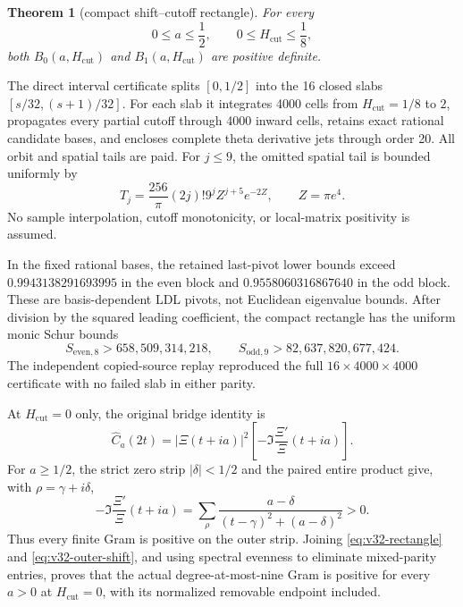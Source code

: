 \documentclass[11pt]{article}
\newtheorem{theorem}{Theorem}[section]
\theoremstyle{definition}
\theoremstyle{remark}
\begin{document}
\begin{theorem}[compact shift--cutoff rectangle]
For every
\begin{equation}
 0\le a\le\frac12,
 \qquad 0\le H_{\mathrm{cut}}\le\frac18,
 \label{eq:v32-rectangle}
\end{equation}
both $B_0(a,H_{\mathrm{cut}})$ and
$B_1(a,H_{\mathrm{cut}})$ are positive definite.
\end{theorem}

The direct interval certificate splits $[0,1/2]$ into the 16 closed slabs
$[s/32,(s+1)/32]$. For each slab it integrates 4000 cells from
$H_{\mathrm{cut}}=1/8$ to $2$, propagates every partial cutoff through 4000
inward cells, retains exact rational candidate bases, and encloses complete
theta derivative jets through order 20. All orbit and spatial tails are paid.
For $j\le9$, the omitted spatial tail is bounded uniformly by
\begin{equation}
 T_j=\frac{256}{\pi}(2j)!9^jZ^{j+5}e^{-2Z},
 \qquad Z=\pi e^4.
 \label{eq:v32-spatial-tail}
\end{equation}
No sample interpolation, cutoff monotonicity, or local-matrix positivity is
assumed.

In the fixed rational bases, the retained last-pivot lower bounds exceed
$0.9943138291693995$ in the even block and $0.9558060316867640$ in the odd
block. These are basis-dependent LDL pivots, not Euclidean eigenvalue bounds.
After division by the squared leading coefficient, the compact rectangle has
the uniform monic Schur bounds
\begin{equation}
 S_{\mathrm{even},8}>658{,}509{,}314{,}218,
 \qquad
 S_{\mathrm{odd},9}>82{,}637{,}820{,}677{,}424.
 \label{eq:v32-monic-bounds}
\end{equation}
The independent copied-source replay reproduced the full
$16\times4000\times4000$ certificate with no failed slab in either parity.

At $H_{\mathrm{cut}}=0$ only, the original bridge identity is
\begin{equation}
 \widehat C_a(2t)=|\Xi(t+ia)|^2
 \left[-\Im\frac{\Xi'}{\Xi}(t+ia)\right].
\end{equation}
For $a\ge1/2$, the strict zero strip $|\delta|<1/2$ \cite{DLMF2510} and the paired entire
product give, with $\rho=\gamma+i\delta$,
\begin{equation}
 -\Im\frac{\Xi'}{\Xi}(t+ia)
 =\sum_\rho\frac{a-\delta}{(t-\gamma)^2+(a-\delta)^2}>0.
 \label{eq:v32-outer-shift}
\end{equation}
Thus every finite Gram is positive on the outer strip. Joining
\eqref{eq:v32-rectangle} and \eqref{eq:v32-outer-shift}, and using spectral
evenness to eliminate mixed-parity entries, proves that the actual
degree-at-most-nine Gram is positive for every $a>0$ at
$H_{\mathrm{cut}}=0$, with its normalized removable endpoint included.
\end{document}
